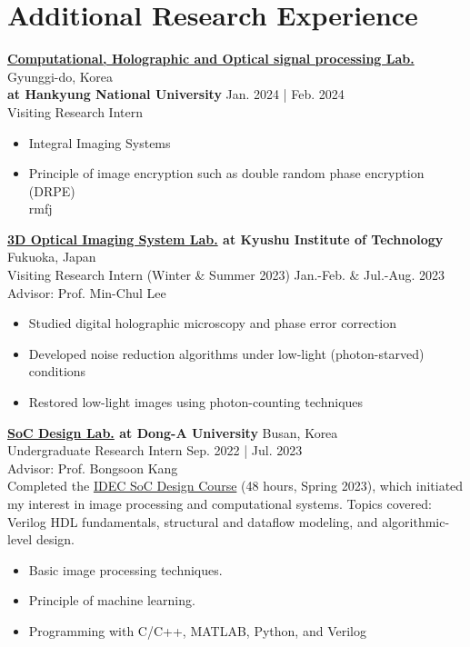 \documentclass[a4paper,9pt]{extarticle}
\begin{document}
\section*{Additional Research Experience}

\noindent
\textbf{\href{https://3cholab.wordpress.com/정보/}{Computational, Holographic and Optical signal processing Lab.}} \hfill Gyunggi-do, Korea\\ %
\textbf{at Hankyung National University} \hfill Jan. 2024 | Feb. 2024 \\
Visiting Research Intern %
\begin{itemize}
    \item Integral Imaging Systems
    \item Principle of image encryption such as double random phase encryption (DRPE) \\rmfj
\end{itemize}

\noindent
\textbf{\href{https://leelab.csn.kyutech.ac.jp}{3D Optical Imaging System Lab.} at Kyushu Institute of Technology} \hfill Fukuoka, Japan\\ %
Visiting Research Intern (Winter \& Summer 2023) \hfill Jan.-Feb. \& Jul.-Aug. 2023\\%
Advisor: Prof. Min-Chul Lee 
\begin{itemize}
    \item Studied digital holographic microscopy and phase error correction  
    \item Developed noise reduction algorithms under low-light (photon-starved) conditions  
    \item Restored low-light images using photon-counting techniques \\
\end{itemize}

\noindent
\textbf{\href{https://soc.donga.ac.kr/soc/Main.do}{SoC Design Lab.} at Dong-A University} \hfill Busan, Korea\\ %
Undergraduate Research Intern \hfill Sep. 2022 | Jul. 2023 \\
Advisor: Prof. Bongsoon Kang \\
Completed the \href{https://github.com/user-attachments/assets/583762df-f208-4216-b836-a6a1921ec34b}{IDEC SoC Design Course} (48 hours, Spring 2023), which initiated my interest in image processing and computational systems.
Topics covered: Verilog HDL fundamentals, structural and dataflow modeling, and algorithmic-level design.
\begin{itemize}
    \item Basic image processing techniques.
    \item Principle of machine learning.
    \item Programming with C/C++, MATLAB, Python, and Verilog \\
\end{itemize}
\end{document}
